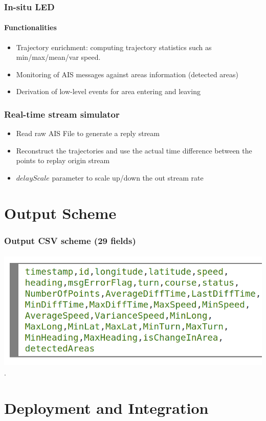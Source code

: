 \frame
{
	\frametitle{In-situ LED}
	\framesubtitle{Functionalities}
	\begin{itemize}[]
	\item Trajectory enrichment: computing trajectory statistics  such as min/max/mean/var speed.
    \item Monitoring of AIS messages against areas information (detected areas)
	\item Derivation of low-level events for area entering and leaving

		
	\end{itemize}
}

\frame
{
	\frametitle{Real-time stream simulator}
	
	\begin{itemize}[]
		\item<1-> Read raw AIS File to  generate a reply stream
		
		\item<1 -> Reconstruct the trajectories and use the actual time difference between the points to replay origin stream
		
		\item<1 -> $delayScale$ parameter to scale up/down the out stream rate
		
	
	\end{itemize}
}


\section{Output Scheme}		
\frame
{		
\frametitle{Output CSV scheme (29 fields)}
\framesubtitle{}

\begin{center}
	\includegraphics[scale=.32,left]{figures/insitu_output.png}\\
	.
\end{center}

}



\section{Deployment and Integration }

